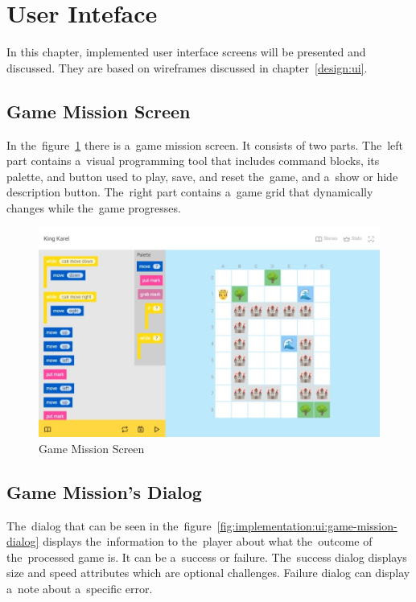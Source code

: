 \section{User Inteface}

In this chapter, implemented user interface screens will be presented and discussed.
They are based on wireframes discussed in chapter~\ref{design:ui}.

\subsection{Game Mission Screen}

In the~figure~\ref{fig:implementation:ui:game-mission} there is a~game mission screen.
It consists of two parts.
The~left part contains a~visual programming tool that includes command blocks, its palette, and button used to play, save, and reset the~game, and a~show or hide description button.
The~right part contains a~game grid that dynamically changes while the~game progresses.

\begin{figure}
    \centering
    \includegraphics[width=1\linewidth]{assets/implementation/ui/kingkarel_game_mission.jpeg}
    \caption{Game Mission Screen}
    \label{fig:implementation:ui:game-mission}
\end{figure}

\subsection{Game Mission's Dialog}

The~dialog that can be seen in the~figure~\ref{fig:implementation:ui:game-mission-dialog} displays the~information to the~player about what the~outcome of the~processed game is.
It can be a~success or failure.
The~success dialog displays size and speed attributes which are optional challenges.
Failure dialog can display a~note about a~specific error.

